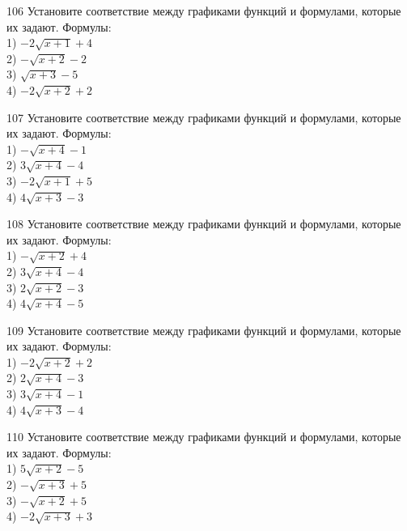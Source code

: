 \documentclass[4apaper]{article}
\begin{document}
\begin{taskBN}{106}
Установите соответствие между графиками функций и формулами, которые их задают. Формулы: \\1) $-2\sqrt{x+1}+4$\\2) $-\sqrt{x+2}-2$\\3) $\sqrt{x+3}-5$\\4) $-2\sqrt{x+2}+2$
\end{taskBN}

\begin{taskBN}{107}
Установите соответствие между графиками функций и формулами, которые их задают. Формулы: \\1) $-\sqrt{x+4}-1$\\2) $3\sqrt{x+4}-4$\\3) $-2\sqrt{x+1}+5$\\4) $4\sqrt{x+3}-3$
\end{taskBN}

\begin{taskBN}{108}
Установите соответствие между графиками функций и формулами, которые их задают. Формулы: \\1) $-\sqrt{x+2}+4$\\2) $3\sqrt{x+4}-4$\\3) $2\sqrt{x+2}-3$\\4) $4\sqrt{x+4}-5$
\end{taskBN}

\begin{taskBN}{109}
Установите соответствие между графиками функций и формулами, которые их задают. Формулы: \\1) $-2\sqrt{x+2}+2$\\2) $2\sqrt{x+4}-3$\\3) $3\sqrt{x+4}-1$\\4) $4\sqrt{x+3}-4$
\end{taskBN}

\begin{taskBN}{110}
Установите соответствие между графиками функций и формулами, которые их задают. Формулы: \\1) $5\sqrt{x+2}-5$\\2) $-\sqrt{x+3}+5$\\3) $-\sqrt{x+2}+5$\\4) $-2\sqrt{x+3}+3$
\end{taskBN}
\end{document}
